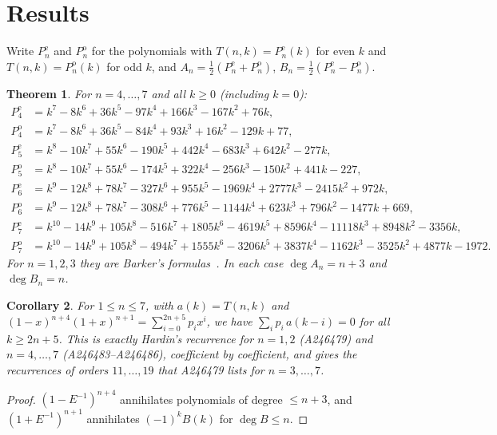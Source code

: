 \documentclass[11pt]{article}
\newtheorem{theorem}{Theorem}
\newtheorem{corollary}[theorem]{Corollary}
\theoremstyle{remark}\newtheorem{remark}[theorem]{Remark}
\begin{document}
\section{Results}
Write $P_n^{\mathrm e}$ and $P_n^{\mathrm o}$ for the polynomials with $T(n,k)=P_n^{\mathrm e}(k)$ for even $k$ and $T(n,k)=P_n^{\mathrm o}(k)$ for odd $k$, and $A_n=\tfrac12(P^{\mathrm e}_n+P^{\mathrm o}_n)$, $B_n=\tfrac12(P^{\mathrm e}_n-P^{\mathrm o}_n)$.
\begin{theorem}\label{thm:rows}
For $n=4,\dots,7$ and all $k\ge0$ (including $k=0$):
\begin{align*}
P_4^{\mathrm e}&=k^7-8k^6+36k^5-97k^4+166k^3-167k^2+76k,\\
P_4^{\mathrm o}&=k^7-8k^6+36k^5-84k^4+93k^3+16k^2-129k+77,\\
P_5^{\mathrm e}&=k^8-10k^7+55k^6-190k^5+442k^4-683k^3+642k^2-277k,\\
P_5^{\mathrm o}&=k^8-10k^7+55k^6-174k^5+322k^4-256k^3-150k^2+441k-227,\\
P_6^{\mathrm e}&=k^9-12k^8+78k^7-327k^6+955k^5-1969k^4+2777k^3-2415k^2+972k,\\
P_6^{\mathrm o}&=k^9-12k^8+78k^7-308k^6+776k^5-1144k^4+623k^3+796k^2-1477k+669,\\
P_7^{\mathrm e}&=k^{10}-14k^9+105k^8-516k^7+1805k^6-4619k^5+8596k^4-11118k^3+8948k^2-3356k,\\
P_7^{\mathrm o}&=k^{10}-14k^9+105k^8-494k^7+1555k^6-3206k^5+3837k^4-1162k^3-3525k^2+4877k-1972.
\end{align*}
For $n=1,2,3$ they are Barker's formulas~\cite{a246479}. In each case $\deg A_n=n+3$ and $\deg B_n=n$.
\end{theorem}
\begin{corollary}\label{cor:rec}
For $1\le n\le7$, with $a(k)=T(n,k)$ and $(1-x)^{n+4}(1+x)^{n+1}=\sum_{i=0}^{2n+5}p_ix^i$, we have $\sum_i p_i\,a(k-i)=0$ for all $k\ge 2n+5$. This is exactly Hardin's recurrence for $n=1,2$ (A246479) and $n=4,\dots,7$ (A246483--A246486), coefficient by coefficient, and gives the recurrences of orders $11,\dots,19$ that A246479 lists for $n=3,\dots,7$.
\end{corollary}
\begin{proof}
$(1-E^{-1})^{n+4}$ annihilates polynomials of degree $\le n+3$, and $(1+E^{-1})^{n+1}$ annihilates $(-1)^kB(k)$ for $\deg B\le n$.
\end{proof}
\end{document}
